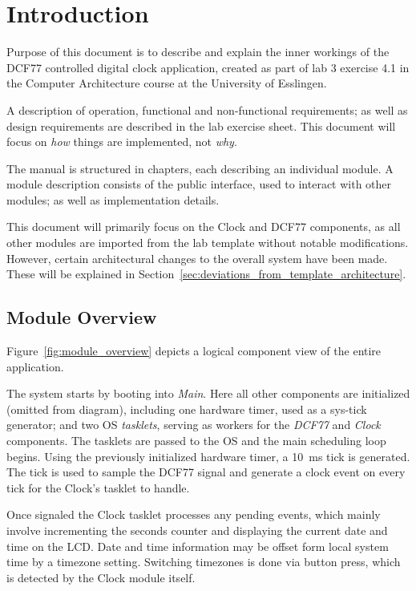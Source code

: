 \chapter{Introduction}

Purpose of this document is to describe and explain the inner workings of the DCF77 controlled digital clock application, created as part of lab 3 exercise 4.1 in the Computer Architecture course at the University of Esslingen.

A description of operation, functional and non-functional requirements; as well as design requirements are described in the lab exercise sheet. This document will focus on \emph{how} things are implemented, not \emph{why}.

The manual is structured in chapters, each describing an individual module. A module description consists of the public interface, used to interact with other modules; as well as implementation details.

This document will primarily focus on the Clock and DCF77 components, as all other modules are imported from the lab template without notable modifications. However, certain architectural changes to the overall system have been made. These will be explained in Section~\ref{sec:deviations_from_template_architecture}.

\section{Module Overview}\label{sec:module_overview}

Figure~\ref{fig:module_overview} depicts a logical component view of the entire application.

The system starts by booting into \emph{Main}. Here all other components are initialized (omitted from diagram), including one hardware timer, used as a sys-tick generator; and two OS \emph{tasklets}, serving as workers for the \emph{DCF77} and \emph{Clock} components. The tasklets are passed to the OS and the main scheduling loop begins. Using the previously initialized hardware timer, a \SI{10}{\milli\second} tick is generated. The tick is used to sample the DCF77 signal and generate a clock event on every  tick for the Clock's tasklet to handle.

Once signaled the Clock tasklet processes any pending events, which mainly involve incrementing the seconds counter and displaying the current date and time on the LCD. Date and time information may be offset form local system time by a timezone setting. Switching timezones is done via button press, which is detected by the Clock module itself.

